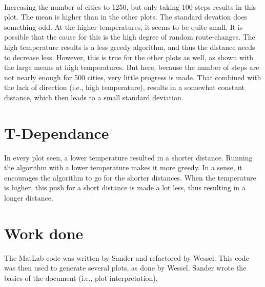 \documentclass[10pt,a4paper]{article}
\begin{document}
 \\
Increasing the number of cities to 1250, but only taking 100 steps results in this plot. The mean is higher than in the other plots. The standard devation does something odd. At the higher temperatures, it seems to be quite small. It is possible that the cause for this is the high degree of random route-changes. The high temperature results is a less greedy algorithm, and thus the distance needs to decrease less. However, this is true for the other plots as well, as shown with the large means at high temperatures. But here, because the number of steps are not nearly enough for 500 cities, very little progress is made. That combined with the lack of direction (i.e., high temperature), results in a somewhat constant distance, which then leads to a small standard deviation.

\section{T-Dependance}
In every plot seen, a lower temperature resulted in a shorter distance. Running the algorithm with a lower temperature makes it more greedy. In a sense, it encourages the algorithm to go for the shorter distances. When the temperature is higher, this push for a short distance is made a lot less, thus resulting in a longer distance.

\section{Work done}
The MatLab code was written by Sander and refactored by Wessel. 
This code was then used to generate several plots, as done by Wessel. Sander wrote the basics of the document (i.e., plot interpretation).
\end{document}
